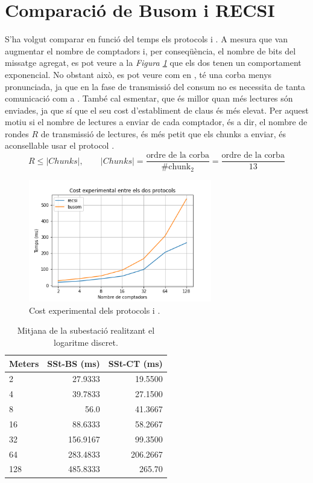 \section{Comparació de Busom i RECSI}
S'ha volgut comparar en funció del temps els protocols \cite{recsi} i \cite{busom}. A mesura que van augmentar el nombre de comptadors i, per conseqüència, el nombre de bits del missatge agregat, es pot veure a la \textit{Figura \ref{fig:prottime}} que els dos tenen un comportament exponencial. No obstant això, es pot veure com en \cite{recsi}, té una corba menys pronunciada, ja que en la fase de transmissió del consum no es necessita de tanta comunicació com a \cite{busom}. També cal esmentar, que \cite{recsi} és millor quan més lectures són enviades, ja que sí que el seu cost d'establiment de claus és més elevat. Per aquest motiu si el nombre de lectures a enviar de cada comptador, és a dir, el nombre de rondes $R$ de transmissió de lectures, és més petit que els chunks a enviar, és aconsellable usar el protocol \cite{busom}.
\[R \le |Chunks|, \qquad |Chunks| = \frac{\textrm{ordre de la corba}}{\#\textrm{chunk}_2} = \frac{\textrm{ordre de la corba}}{13}\]
\begin{figure}[H]
	\centering
	\includegraphics[width=8cm]{imgs/cost/prottime.png}
	\caption{Cost experimental dels protocols \cite{recsi} i \cite{busom}.}
	\label{fig:prottime}
\end{figure}
\begin{table}[H]
	\centering
	\begin{tabular}{l|rr}
		Meters & SSt-BS (ms) & SSt-CT (ms) \\ \hline
		2      &     27.9333 &     19.5500 \\
		4      &     39.7833 &     27.1500 \\
		8      &        56.0 &     41.3667 \\
		16     &     88.6333 &     58.2667 \\
		32     &    156.9167 &     99.3500 \\
		64     &    283.4833 &    206.2667 \\
		128    &    485.8333 &      265.70
	\end{tabular}
	\caption{Mitjana de la subestació realitzant el logaritme discret.}
	\label{ana:tab1}
\end{table}

